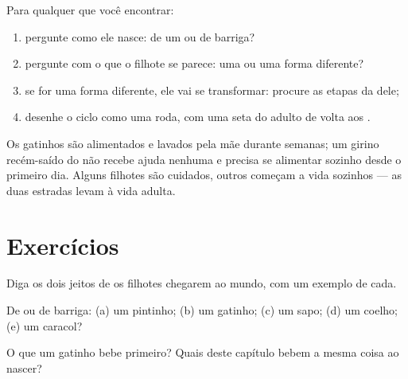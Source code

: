 \begin{method}\label{met:g2:animals-grow-up:read}
Para qualquer  que você encontrar:
\begin{enumerate}
  \item pergunte como ele nasce: de um  ou de barriga?
  \item pergunte com o que o filhote se parece: uma  ou uma forma diferente?
  \item se for uma forma diferente, ele vai se transformar: procure
        as etapas da  dele;
  \item desenhe o ciclo como uma roda, com uma seta do adulto de
        volta aos .
\end{enumerate}
\end{method}

\begin{remark}\label{rem:g2:animals-grow-up:care}
Os gatinhos são alimentados e lavados pela mãe durante semanas; um
girino recém-saído do  não recebe ajuda nenhuma e precisa se
alimentar sozinho desde o primeiro dia. Alguns filhotes são cuidados,
outros começam a vida sozinhos --- as duas estradas levam à vida
adulta.
\end{remark}

\section{Exercícios}

\begin{exercise}[$\star$]\label{exo:g2:animals-grow-up:1}
Diga os dois jeitos de os filhotes chegarem ao mundo, com um exemplo
de cada.
\end{exercise}

\begin{exercise}[$\star$]\label{exo:g2:animals-grow-up:2}
De  ou de barriga: (a) um pintinho; (b) um gatinho; (c) um sapo;
(d) um coelho; (e) um caracol?
\end{exercise}

\begin{exercise}[$\star$]\label{exo:g2:animals-grow-up:3}
O que um gatinho bebe primeiro? Quais  deste capítulo bebem a
mesma coisa ao nascer?
\end{exercise}

